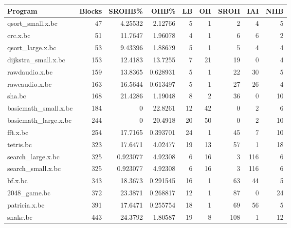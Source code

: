 \begin{tabular}{lrrrr}
\hline
\end{tabular}\begin{tabular}{lrrrrrrrr}
\hline
 Program              &   Blocks &    SROHB\% &       OHB\% &   LB &   OH &   SROH &   IAI &   NHB \\
\hline
 qsort\_small.x.bc     &       47 &  4.25532  &  2.12766   &    5 &    1 &      2 &     4 &     5 \\
 crc.x.bc             &       51 & 11.7647   &  1.96078   &    4 &    1 &      6 &     6 &     2 \\
 qsort\_large.x.bc     &       53 &  9.43396  &  1.88679   &    5 &    1 &      5 &     4 &     4 \\
 dijkstra\_small.x.bc  &      153 & 12.4183   & 13.7255    &    7 &   21 &     19 &     0 &     4 \\
 rawdaudio.x.bc       &      159 & 13.8365   &  0.628931  &    5 &    1 &     22 &    30 &     5 \\
 rawcaudio.x.bc       &      163 & 16.5644   &  0.613497  &    5 &    1 &     27 &    26 &     4 \\
 sha.bc               &      168 & 21.4286   &  1.19048   &    8 &    2 &     36 &     0 &    10 \\
 basicmath\_small.x.bc &      184 &  0        & 22.8261    &   12 &   42 &      0 &     2 &     6 \\
 basicmath\_large.x.bc &      244 &  0        & 20.4918    &   20 &   50 &      0 &     2 &    10 \\
 fft.x.bc             &      254 & 17.7165   &  0.393701  &   24 &    1 &     45 &     7 &    10 \\
 tetris.bc            &      323 & 17.6471   &  4.02477   &   19 &   13 &     57 &     1 &    18 \\
 search\_large.x.bc    &      325 &  0.923077 &  4.92308   &    6 &   16 &      3 &   116 &     6 \\
 search\_small.x.bc    &      325 &  0.923077 &  4.92308   &    6 &   16 &      3 &   116 &     6 \\
 bf.x.bc              &      343 & 18.3673   &  0.291545  &   16 &    1 &     63 &    44 &     5 \\
 2048\_game.bc         &      372 & 23.3871   &  0.268817  &   12 &    1 &     87 &     0 &    24 \\
 patricia.x.bc        &      391 & 17.6471   &  0.255754  &   18 &    1 &     69 &    56 &     5 \\
 snake.bc             &      443 & 24.3792   &  1.80587   &   19 &    8 &    108 &     1 &    12 \\

\end{tabular}

